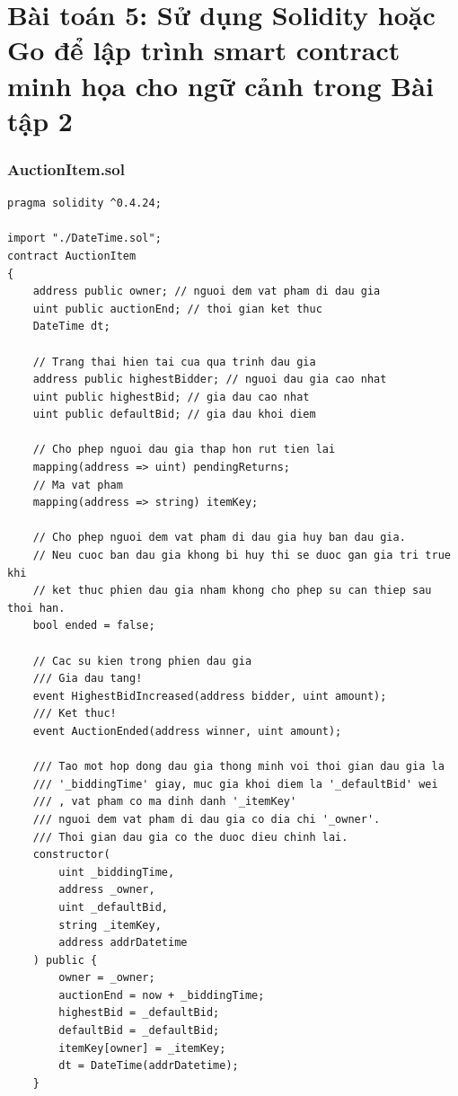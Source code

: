 \documentclass[a4paper]{article}
\begin{document}
\section{Bài toán 5: Sử dụng Solidity hoặc Go để lập trình smart contract minh họa cho ngữ cảnh trong
Bài tập 2}
\begin{frame}
\frametitle{AuctionItem.sol}
\begin{lstlisting}[basicstyle=\small]
pragma solidity ^0.4.24;

import "./DateTime.sol";
contract AuctionItem
{
    address public owner; // nguoi dem vat pham di dau gia
    uint public auctionEnd; // thoi gian ket thuc
    DateTime dt;

    // Trang thai hien tai cua qua trinh dau gia
    address public highestBidder; // nguoi dau gia cao nhat
    uint public highestBid; // gia dau cao nhat
    uint public defaultBid; // gia dau khoi diem

    // Cho phep nguoi dau gia thap hon rut tien lai
    mapping(address => uint) pendingReturns;
    // Ma vat pham
    mapping(address => string) itemKey;

    // Cho phep nguoi dem vat pham di dau gia huy ban dau gia.
    // Neu cuoc ban dau gia khong bi huy thi se duoc gan gia tri true khi
    // ket thuc phien dau gia nham khong cho phep su can thiep sau thoi han.
    bool ended = false;

    // Cac su kien trong phien dau gia
    /// Gia dau tang!
    event HighestBidIncreased(address bidder, uint amount);
    /// Ket thuc!
    event AuctionEnded(address winner, uint amount);

    /// Tao mot hop dong dau gia thong minh voi thoi gian dau gia la
    /// '_biddingTime' giay, muc gia khoi diem la '_defaultBid' wei
    /// , vat pham co ma dinh danh '_itemKey'
    /// nguoi dem vat pham di dau gia co dia chi '_owner'.
    /// Thoi gian dau gia co the duoc dieu chinh lai.
    constructor(
        uint _biddingTime,
        address _owner,
        uint _defaultBid,
        string _itemKey,
        address addrDatetime
    ) public {
        owner = _owner;
        auctionEnd = now + _biddingTime;
        highestBid = _defaultBid;
        defaultBid = _defaultBid;
        itemKey[owner] = _itemKey;
        dt = DateTime(addrDatetime);
    }


\end{lstlisting}
\end{frame}
\end{document}
